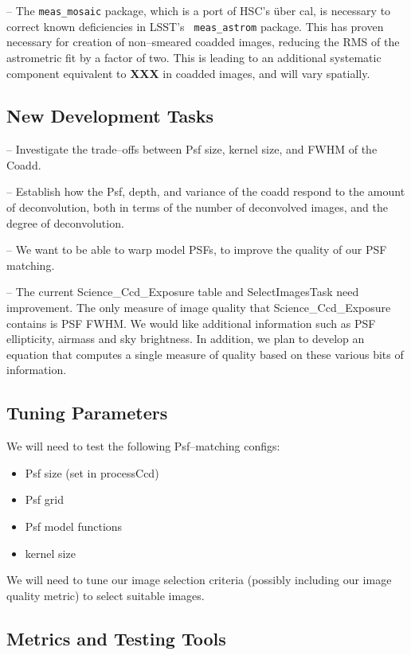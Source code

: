 \documentclass[12pt]{article}
\begin{document}
-- The {\tt meas\_mosaic} package, which is a port of HSC's \"{u}ber
cal, is necessary to correct known deficiencies in LSST's {\tt
  meas\_astrom} package.  This has proven necessary for creation of
non--smeared coadded images, reducing the RMS of the astrometric fit
by a factor of two.  This is leading to an additional systematic
component equivalent to {\bf XXX} in coadded images, and will vary
spatially.

\subsection{New Development Tasks}

-- Investigate the trade--offs between Psf size, kernel size, and FWHM
of the Coadd.

-- Establish how the Psf, depth, and variance of the coadd respond to
the amount of deconvolution, both in terms of the number of
deconvolved images, and the degree of deconvolution.

-- We want to be able to warp model PSFs, to improve the quality of our PSF matching.

-- The current Science\_Ccd\_Exposure table and SelectImagesTask need improvement.
The only measure of image quality that Science\_Ccd\_Exposure contains is PSF FWHM.
We would like additional information such as PSF ellipticity, airmass and sky brightness.
In addition, we plan to develop an equation that computes a single measure of quality
based on these various bits of information.

\subsection{Tuning Parameters}
We will need to test the following Psf--matching configs:
\begin{itemize}
\item Psf size (set in processCcd)
\item Psf grid 
\item Psf model functions
\item kernel size
\end{itemize}

We will need to tune our image selection criteria (possibly including our image quality metric)
to select suitable images.

\subsection{Metrics and Testing Tools}
\end{document}
